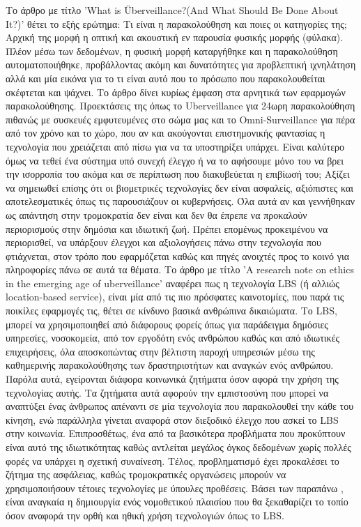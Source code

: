 \documentclass{article}
\begin{document}
Το άρθρο με τίτλο 'What is Überveillance?(And What Should Be Done About It?)' θέτει το εξής ερώτημα: Τι είναι η παρακολούθηση και ποιες οι κατηγορίες της; Αρχική της μορφή η οπτική και ακουστική εν παρουσία φυσικής μορφής (φύλακα). Πλέον μέσω των δεδομένων, η φυσική μορφή καταργήθηκε και η παρακολούθηση αυτοματοποιήθηκε, προβάλλοντας ακόμη και δυνατότητες για προβλεπτική ιχνηλάτηση αλλά και μία εικόνα για το τι είναι αυτό που το πρόσωπο που παρακολουθείται σκέφτεται και ψάχνει.  Το άρθρο δίνει κυρίως έμφαση στα αρνητικά των εφαρμογών παρακολούθησης. Προεκτάσεις της όπως το Uberveillance για 24ωρη παρακολούθηση πιθανώς με συσκευές εμφυτευμένες στο σώμα μας και το Omni-Surveillance για πέρα από τον χρόνο και το χώρο, που αν και ακούγονται επιστημονικής φαντασίας η τεχνολογία που χρειάζεται από πίσω για να τα υποστηρίξει υπάρχει. Είναι καλύτερο όμως να τεθεί ένα σύστημα υπό συνεχή έλεγχο ή  να το αφήσουμε μόνο του να βρει την ισορροπία του ακόμα και σε περίπτωση που διακυβεύεται η επιβίωσή του; Αξίζει να σημειωθεί επίσης ότι οι βιομετρικές τεχνολογίες δεν είναι ασφαλείς,  αξιόπιστες και αποτελεσματικές όπως τις παρουσιάζουν οι κυβερνήσεις. Όλα αυτά αν και γεννήθηκαν ως απάντηση στην τρομοκρατία δεν είναι και δεν θα έπρεπε να προκαλούν περιορισμούς στην δημόσια και ιδιωτική ζωή. Πρέπει επομένως προκειμένου να περιορισθεί, να υπάρξουν έλεγχοι και αξιολογήσεις πάνω στην τεχνολογία που φτιάχνεται, στον τρόπο που εφαρμόζεται καθώς και πηγές ανοιχτές προς το κοινό για πληροφορίες πάνω σε αυτά τα θέματα.\newline
Το άρθρο με τίτλο 'A research note on ethics in the emerging age of uberveillance' αναφέρει πως η τεχνολογία LBS (ή αλλιώς location-based service), είναι μία από τις πιο πρόσφατες καινοτομίες, που παρά τις ποικίλες εφαρμογές τις, θέτει σε κίνδυνο βασικά ανθρώπινα δικαιώματα. Το LBS, μπορεί να χρησιμοποιηθεί από διάφορους φορείς όπως για παράδειγμα  δημόσιες υπηρεσίες, νοσοκομεία, από τον εργοδότη ενός ανθρώπου καθώς και από ιδιωτικές επιχειρήσεις, όλα αποσκοπώντας στην βέλτιστη παροχή υπηρεσιών μέσω της καθημερινής παρακολούθησης των δραστηριοτήτων και αναγκών ενός ανθρώπου. Παρόλα αυτά, εγείρονται διάφορα κοινωνικά ζητήματα όσον αφορά την χρήση της τεχνολογίας αυτής. Τα ζητήματα αυτά αφορούν την εμπιστοσύνη που μπορεί να αναπτύξει ένας άνθρωπος απέναντι σε μία τεχνολογία που παρακολουθεί την κάθε του κίνηση, ενώ παράλληλα γίνεται αναφορά στον διεξοδικό έλεγχο που ασκεί το LBS στην κοινωνία. Επιπροσθέτως, ένα από τα βασικότερα προβλήματα  που προκύπτουν είναι αυτό της ιδιωτικότητας καθώς αντλείται μεγάλος όγκος δεδομένων χωρίς πολλές φορές να υπάρχει η σχετική συναίνεση. Τέλος, προβληματισμό έχει προκαλέσει το ζήτημα της ασφάλειας, καθώς τρομοκρατικές οργανώσεις μπορούν να χρησιμοποιήσουν τέτοιες τεχνολογίες με ύπουλες προθέσεις. Βάσει των παραπάνω , είναι αναγκαία η δημιουργία ενός νομοθετικού πλαισίου που θα ξεκαθαρίζει το τοπίο όσον αναφορά την ορθή και ηθική χρήση τεχνολογιών όπως το LBS.\newline
\end{document}
